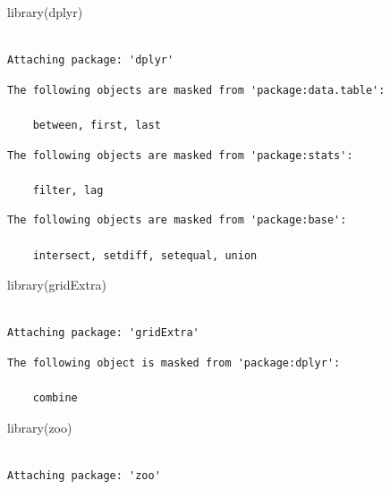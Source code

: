 \documentclass[
  letterpaper,
  DIV=11,
  numbers=noendperiod]{scrartcl}
\newenvironment{Shaded}{\begin{snugshade}}{\end{snugshade}}
\newcommand{\FunctionTok}[1]{\textcolor[rgb]{0.28,0.35,0.67}{#1}}
\newcommand{\NormalTok}[1]{\textcolor[rgb]{0.00,0.23,0.31}{#1}}
\begin{document}
\begin{Shaded}
\begin{Highlighting}[]
\FunctionTok{library}\NormalTok{(dplyr)}
\end{Highlighting}
\end{Shaded}

\begin{verbatim}

Attaching package: 'dplyr'
\end{verbatim}

\begin{verbatim}
The following objects are masked from 'package:data.table':

    between, first, last
\end{verbatim}

\begin{verbatim}
The following objects are masked from 'package:stats':

    filter, lag
\end{verbatim}

\begin{verbatim}
The following objects are masked from 'package:base':

    intersect, setdiff, setequal, union
\end{verbatim}

\begin{Shaded}
\begin{Highlighting}[]
\FunctionTok{library}\NormalTok{(gridExtra)}
\end{Highlighting}
\end{Shaded}

\begin{verbatim}

Attaching package: 'gridExtra'
\end{verbatim}

\begin{verbatim}
The following object is masked from 'package:dplyr':

    combine
\end{verbatim}

\begin{Shaded}
\begin{Highlighting}[]
\FunctionTok{library}\NormalTok{(zoo)}
\end{Highlighting}
\end{Shaded}

\begin{verbatim}

Attaching package: 'zoo'
\end{verbatim}
\end{document}

